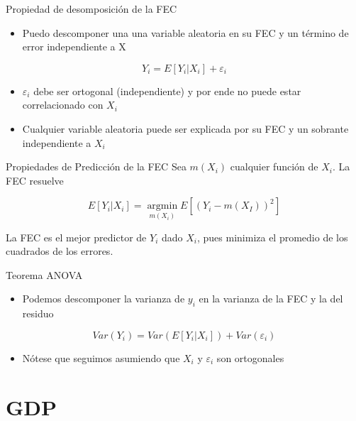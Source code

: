 \documentclass[
  ignorenonframetext,
]{beamer}
\providecommand{\tightlist}{%
  \setlength{\itemsep}{0pt}\setlength{\parskip}{0pt}}
\begin{document}
\begin{frame}{Propiedad de desomposición de la FEC}
\protect\hypertarget{propiedad-de-desomposiciuxf3n-de-la-fec}{}
\begin{itemize}
\tightlist
\item
  Puedo descomponer una una variable aleatoria en su FEC y un término de
  error independiente a X
\end{itemize}

\[Y_i=E[ Y_i | X_i] + \varepsilon_i \]

\begin{itemize}
\item
  \(\varepsilon_i\) debe ser ortogonal (independiente) y por ende no
  puede estar correlacionado con \(X_i\)
\item
  Cualquier variable aleatoria puede ser explicada por su FEC y un
  sobrante independiente a \(X_i\)
\end{itemize}
\end{frame}

\begin{frame}{Propiedades de Predicción de la FEC}
\protect\hypertarget{propiedades-de-predicciuxf3n-de-la-fec}{}
Sea \(m(X_i)\) cualquier función de \(X_i\). La FEC resuelve

\[ E[Y_i | X_i] =  \underset{m(X_i)}{\operatorname{argmin}} E[(Y_i-m(X_I))^2]\]

La FEC es el mejor predictor de \(Y_i\) dado \(X_i\), pues minimiza el
promedio de los cuadrados de los errores.
\end{frame}

\begin{frame}{Teorema ANOVA}
\protect\hypertarget{teorema-anova}{}
\begin{itemize}
\tightlist
\item
  Podemos descomponer la varianza de \(y_i\) en la varianza de la FEC y
  la del residuo
\end{itemize}

\[ Var(Y_i)= Var(E[ Y_i | X_i]) + Var(\varepsilon_i) \]

\begin{itemize}
\tightlist
\item
  Nótese que seguimos asumiendo que \(X_i\) y \(\varepsilon_i\) son
  ortogonales
\end{itemize}
\end{frame}

\hypertarget{gdp}{%
\section{GDP}\label{gdp}}
\end{document}
